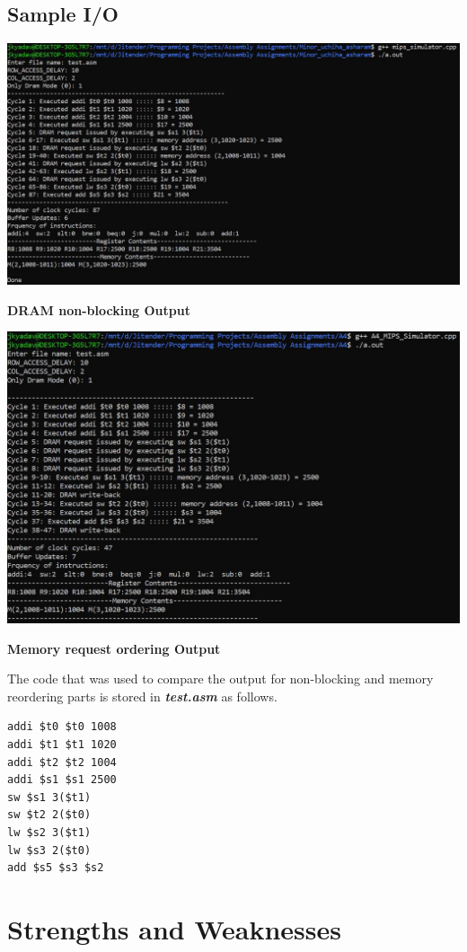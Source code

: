 \documentclass{article} %
\begin{document}
\subsection{Sample I/O}
\includegraphics[scale = 0.567]{sampleio_minor.JPG}
\begin{center}
    \textbf{DRAM non-blocking Output}
\end{center}
\includegraphics[scale = 0.64]{sampleio_A4.JPG}
\begin{center}
    \textbf{Memory request ordering Output}
\end{center}
The code that was used to compare the output for non-blocking and memory reordering parts is stored in \textbf{\textit{test.asm}} as follows.
\begin{verbatim}
addi $t0 $t0 1008
addi $t1 $t1 1020
addi $t2 $t2 1004
addi $s1 $s1 2500
sw $s1 3($t1)
sw $t2 2($t0)
lw $s2 3($t1)
lw $s3 2($t0)
add $s5 $s3 $s2
\end{verbatim}

\section{Strengths and Weaknesses}
\end{document}
